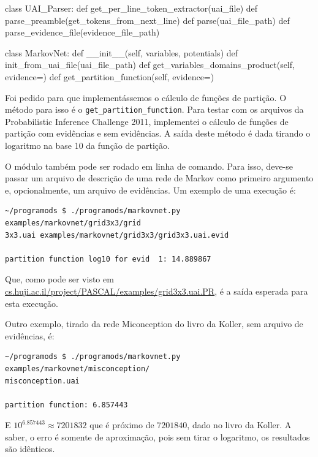 \documentclass[paper=a4, fontsize=11pt]{scrartcl} %
\numberwithin{equation}{subsection}
\numberwithin{figure}{subsection}
\numberwithin{table}{subsection}
\numberwithin{definition}{subsection}
\numberwithin{theorem}{subsection}
\numberwithin{property}{subsection}
\numberwithin{proposition}{subsection}
\numberwithin{equation}{section}
\numberwithin{figure}{section}
\numberwithin{table}{section}
\numberwithin{definition}{section}
\numberwithin{theorem}{section}
\numberwithin{property}{section}
\numberwithin{proposition}{section}
\begin{document}
\begin{python}
class UAI_Parser:
  def get_per_line_token_extractor(uai_file)
  def parse_preamble(get_tokens_from_next_line)
  def parse(uai_file_path)
  def parse_evidence_file(evidence_file_path)

class MarkovNet:
  def __init__(self, variables, potentials)
  def init_from_uai_file(uai_file_path)
  def get_variables_domains_product(self, evidence={})
  def get_partition_function(self, evidence={})
\end{python}

Foi pedido para que implementássemos o cálculo de funções de partição. O método para isso é o \verb|get_partition_function|. Para testar com os arquivos da Probabilistic Inference Challenge 2011, implementei o cálculo de funções de partição com evidências e sem evidências. A saída deste método é dada tirando o logaritmo na base 10 da função de partição.

O módulo também pode ser rodado em linha de comando. Para isso, deve-se passar um arquivo de descrição de uma rede de Markov como primeiro argumento e, opcionalmente, um arquivo de evidências. Um exemplo de uma execução é:
\begin{verbatim}
~/programods $ ./programods/markovnet.py examples/markovnet/grid3x3/grid
3x3.uai examples/markovnet/grid3x3/grid3x3.uai.evid

partition function log10 for evid  1: 14.889867
\end{verbatim}

Que, como pode ser visto em \url{cs.huji.ac.il/project/PASCAL/examples/grid3x3.uai.PR}, é a saída esperada para esta execução.

Outro exemplo, tirado da rede Miconception do livro da Koller, sem arquivo de evidências, é:
\begin{verbatim}
~/programods $ ./programods/markovnet.py examples/markovnet/misconception/
misconception.uai

partition function: 6.857443
\end{verbatim}

E $10^{6.857443} \approx 7201832$ que é próximo de $7201840$, dado no livro da Koller. A saber, o erro é somente de aproximação, pois sem tirar o logaritmo, os resultados são idênticos.
\end{document}
